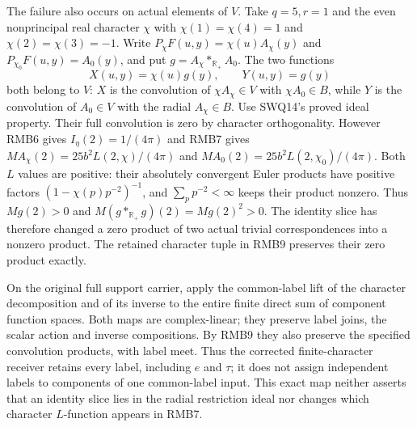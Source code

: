 \documentclass[11pt]{article}
\begin{document}
The failure also occurs on actual elements of $V$.
Take $q=5,r=1$ and the even nonprincipal real character
$\chi$ with $\chi(1)=\chi(4)=1$ and
$\chi(2)=\chi(3)=-1$. Write
$P_\chi F(u,y)=\chi(u)A_\chi(y)$ and
$P_{\chi_0}F(u,y)=A_0(y)$, and put
$g=A_\chi*_{\mathbb R_+}A_0$. The two functions
\begin{equation}\tag{RMB10}
 X(u,y)=\chi(u)g(y),\qquad Y(u,y)=g(y)
\end{equation}
both belong to $V$: $X$ is the convolution of
$\chi A_\chi\in V$ with $\chi A_0\in B$, while $Y$
is the convolution of $A_0\in V$ with the radial
$A_\chi\in B$. Use SWQ14's proved ideal property.
Their full convolution is zero by character orthogonality.
However RMB6 gives $I_\eta(2)=1/(4\pi)$ and RMB7 gives
$M A_\chi(2)=25b^2L(2,\chi)/(4\pi)$ and
$M A_0(2)=25b^2L(2,\chi_0)/(4\pi)$.
Both $L$ values are positive: their absolutely convergent
Euler products have positive factors
$(1-\chi(p)p^{-2})^{-1}$, and
$\sum_p p^{-2}<\infty$ keeps their product nonzero.
Thus $Mg(2)>0$ and $M(g*_{\mathbb R_+}g)(2)=Mg(2)^2>0$.
The identity slice has therefore changed a zero product of
two actual trivial correspondences into a nonzero product.
The retained character tuple in RMB9 preserves their zero
product exactly.

On the original full support carrier, apply the common-label
lift of the character decomposition and of its inverse to
the entire finite direct sum of component function spaces.
Both maps are complex-linear; they preserve label joins,
the scalar action and inverse compositions. By RMB9 they
also preserve the specified convolution products, with label
meet. Thus the corrected finite-character receiver retains
every label, including $e$ and $\tau$; it does not assign
independent labels to components of one common-label input.
This exact map neither asserts that an identity slice lies
in the radial restriction ideal nor changes which character
$L$-function appears in RMB7.

\clearpage
\end{document}
